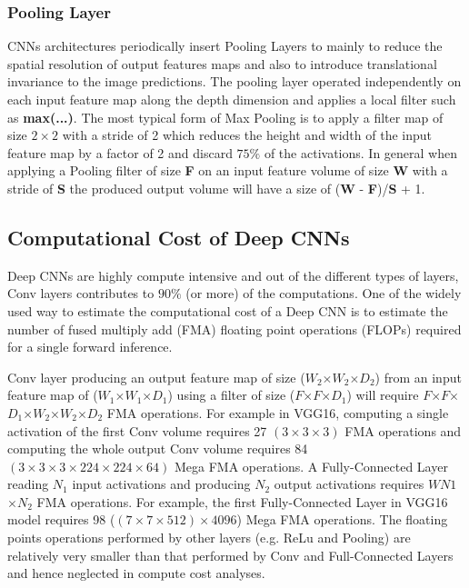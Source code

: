 \subsubsection{Pooling Layer}
CNNs architectures periodically insert Pooling Layers to mainly to reduce the spatial resolution of output features maps and also to introduce translational invariance to the image predictions. The pooling layer operated independently on each input feature map along the depth dimension and applies a local filter such as \textbf{max(...)}. The most typical form of Max Pooling is to apply a filter map of size $2\times2$ with a stride of 2 which reduces the height and width of the input feature map by a factor of 2 and discard $75\%$ of the activations. In general when applying a Pooling filter of size \textbf{F} on an input feature volume of size \textbf{W} with a stride of \textbf{S} the produced output volume will have a size of (\textbf{W} - \textbf{F})/\textbf{S} + 1.

\subsection{Computational Cost of Deep CNNs}
Deep CNNs are highly compute intensive and out of the different types of layers, Conv layers contributes to $90\%$ (or more) of the computations. One of the widely used way to estimate the computational cost of a Deep CNN is to estimate the number of fused multiply add (FMA) floating point operations (FLOPs) required for a single forward inference.

Conv layer producing an output feature map of size (\textbf{$W_2$}$\times$\textbf{$W_2$}$\times$\textbf{$D_2$}) from an input feature map of (\textbf{$W_1$}$\times$\textbf{$W_1$}$\times$\textbf{$D_1$}) using a filter of size (\textbf{$F$}$\times$\textbf{$F$}$\times$\textbf{$D_1$}) will require \textbf{$F$}$\times$\textbf{$F$}$\times$\textbf{$D_1$}$\times$\textbf{$W_2$}$\times$\textbf{$W_2$}$\times$\textbf{$D_2$} FMA operations.
For example in VGG16, computing a single activation of the first Conv volume requires 27 $(3\times3\times3)$ FMA operations and computing the whole output Conv volume requires 84 $(3\times3\times3\times224\times224\times64)$ Mega FMA operations. A Fully-Connected Layer reading \textbf{$N_1$} input activations and producing \textbf{$N_2$} output activations requires \textbf{$WN1$}$\times$\textbf{$N_2$} FMA operations.
For example, the first Fully-Connected Layer in VGG16 model requires 98 ($(7\times7\times512)\times4096$) Mega FMA operations.
The floating points operations performed by other layers (e.g. ReLu and Pooling) are relatively very smaller than that performed by Conv and Full-Connected Layers and hence neglected in compute cost analyses.

